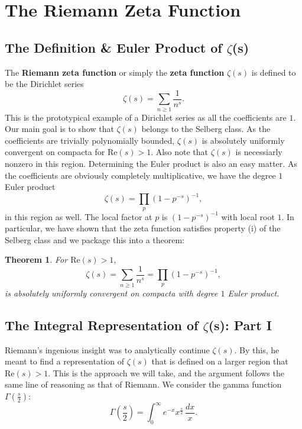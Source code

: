 \documentclass[12pt]{book}
\newtheorem{theorem}{Theorem}[section]
\theoremstyle{definition}\newframedtheorem{method}{Method}
\newcommand{\z}{\zeta}
\newcommand{\G}{\Gamma}
\newcommand{\<}{\langle}
\renewcommand{\>}{\rangle}
\renewcommand{\Re}{\mathrm{Re}}
\begin{document}
  \section{The Riemann Zeta Function}\label{sec:The_Riemann_Zeta_Function}
    \subsection*{The Definition \& Euler Product of \texorpdfstring{$\z$}{z}(s)}
      The \textbf{Riemann zeta function} or simply the \textbf{zeta function} $\z(s)$ is defined to be the Dirichlet series
      \[
        \z(s) = \sum_{n \ge 1}\frac{1}{n^{s}}.
      \]
      This is the prototypical example of a Dirichlet series as all the coefficients are $1$. Our main goal is to show that $\z(s)$ belongs to the Selberg class. As the coefficients are trivially polynomially bounded, $\z(s)$ is absolutely uniformly convergent on compacta for $\Re(s) > 1$. Also note that $\z(s)$ is necessiarly nonzero in this region. Determining the Euler product is also an easy matter. As the coefficients are obviously completely multiplicative, we have the degree $1$ Euler product
      \[
        \z(s) = \prod_{p}(1-p^{-s})^{-1},
      \]
      in this region as well. The local factor at $p$ is $(1-p^{-s})^{-1}$ with local root $1$. In particular, we have shown that the zeta function satisfies property (i) of the Selberg class and we package this into a theorem:

      \begin{theorem}
        For $\Re(s) > 1$,
        \[
          \z(s) = \sum_{n \ge 1}\frac{1}{n^{s}} = \prod_{p}(1-p^{-s})^{-1},
        \]
        is absolutely uniformly convergent on compacta with degree $1$ Euler product.
      \end{theorem}
    \subsection*{The Integral Representation of \texorpdfstring{$\z$}{z}(s): Part I}
      Riemann's ingenious insight was to analytically continue $\z(s)$. By this, he meant to find a representation of $\z(s)$ that is defined on a larger region that $\Re(s) > 1$. This is the approach we will take, and the argument follows the same line of reasoning as that of Riemann. We consider the gamma function $\G\left(\frac{s}{2}\right)$:
      \[
        \G\left(\frac{s}{2}\right) = \int_{0}^{\infty}e^{-x}x^{\frac{s}{2}}\,\frac{dx}{x}.
      \]
\end{document}
